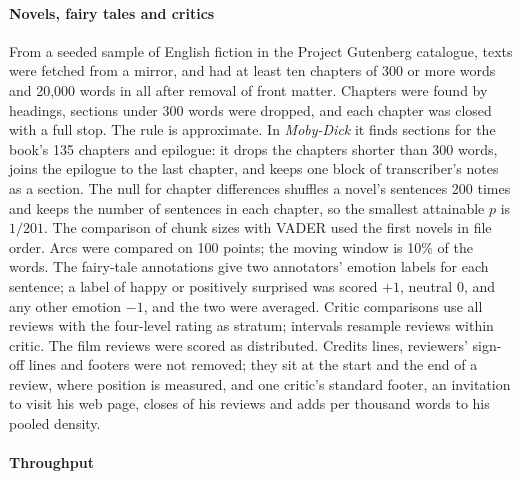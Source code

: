 \paragraph{Novels, fairy tales and critics}
From a seeded sample of English fiction in the Project Gutenberg catalogue, \nNovelFiles{} texts were fetched from a mirror, and \nNovels{} had at least ten chapters of 300 or more words and 20,000 words in all after removal of front matter. Chapters were found by headings, sections under 300 words were dropped, and each chapter was closed with a full stop. The rule is approximate. In \emph{Moby-Dick} it finds \mobyChapters{} sections for the book's 135 chapters and epilogue: it drops the chapters shorter than 300 words, joins the epilogue to the last chapter, and keeps one block of transcriber's notes as a section. The null for chapter differences shuffles a novel's sentences 200 times and keeps the number of sentences in each chapter, so the smallest attainable $p$ is $1/201$. The comparison of chunk sizes with VADER used the first \vaderBooks{} novels in file order. Arcs were compared on 100 points; the moving window is 10\% of the words. The fairy-tale annotations\cite{alm2005} give two annotators' emotion labels for each sentence; a label of happy or positively surprised was scored $+1$, neutral 0, and any other emotion $-1$, and the two were averaged. Critic comparisons use all \nCritReviews{} reviews with the four-level rating as stratum; intervals resample reviews within critic. The film reviews were scored as distributed. Credits lines, reviewers' sign-off lines and footers were not removed; they sit at the start and the end of a review, where position is measured, and one critic's standard footer, an invitation to visit his web page, closes \footWith{} of his \footReviews{} reviews and adds \footAdded{} per thousand words to his pooled density.

\machineMethods

\paragraph{Throughput}
\speedMethods

